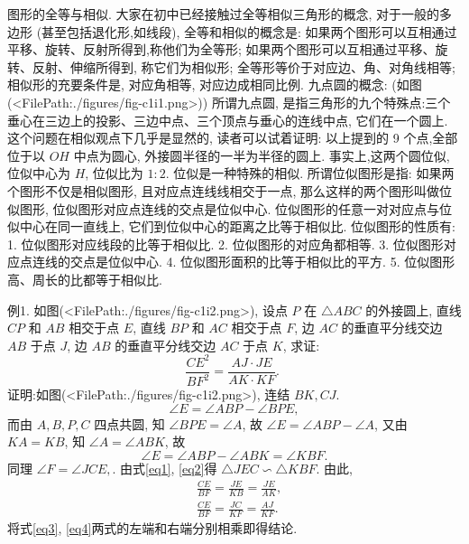 
图形的全等与相似.
大家在初中已经接触过全等相似三角形的概念, 对于一般的多边形 (甚至包括退化形,如线段), 全等和相似的概念是:
如果两个图形可以互相通过平移、旋转、反射所得到,称他们为全等形; 如果两个图形可以互相通过平移、旋转、反射、伸缩所得到, 称它们为相似形; 全等形等价于对应边、角、对角线相等; 相似形的充要条件是, 对应角相等, 对应边成相同比例.
九点圆的概念: (如图(<FilePath:./figures/fig-c1i1.png>))
所谓九点圆, 是指三角形的九个特殊点:三个垂心在三边上的投影、三边中点、三个顶点与垂心的连线中点, 它们在一个圆上.
这个问题在相似观点下几乎是显然的, 读者可以试着证明: 以上提到的 9 个点,全部位于以 $O H$ 中点为圆心, 外接圆半径的一半为半径的圆上.
事实上,这两个圆位似,位似中心为 $H$, 位似比为 $1: 2$.
位似是一种特殊的相似.
所谓位似图形是指: 如果两个图形不仅是相似图形, 且对应点连线线相交于一点, 那么这样的两个图形叫做位似图形, 位似图形对应点连线的交点是位似中心.
位似图形的任意一对对应点与位似中心在同一直线上, 它们到位似中心的距离之比等于相似比.
位似图形的性质有:
1. 位似图形对应线段的比等于相似比.
2. 位似图形的对应角都相等.
3. 位似图形对应点连线的交点是位似中心.
4. 位似图形面积的比等于相似比的平方.
5. 位似图形高、周长的比都等于相似比.



例1. 如图(<FilePath:./figures/fig-c1i2.png>), 设点 $P$ 在 $\triangle A B C$ 的外接圆上, 直线 $C P$ 和 $A B$ 相交于点 $E$, 直线 $B P$ 和 $A C$ 相交于点 $F$, 边 $A C$ 的垂直平分线交边 $A B$ 于点 $J$, 边 $A B$ 的垂直平分线交边 $A C$ 于点 $K$, 求证:
$$
\frac{C E^2}{B F^2}=\frac{A J \cdot J E}{A K \cdot K F} \text {. }
$$
证明:如图(<FilePath:./figures/fig-c1i2.png>), 连结 $B K, C J$.
$$
\angle E=\angle A B P-\angle B P E,
$$
而由 $A, B, P, C$ 四点共圆, 知 $\angle B P E=\angle A$, 故 $\angle E=\angle A B P-\angle A$, 又由 $K A=K B$, 知 $\angle A= \angle A B K$, 故
$$
\angle E=\angle A B P-\angle A B K=\angle K B F . \label{eq1}
$$
同理 $\angle F=\angle J C E, \label{eq2}$.
由式\ref{eq1}, \ref{eq2}得 $\triangle J E C \backsim \triangle K B F$.
由此,
$$
\begin{aligned}
& \frac{C E}{B F}=\frac{J E}{K B}=\frac{J E}{A K},  \label{eq3}\\
& \frac{C E}{B F}=\frac{J C}{K F}=\frac{A J}{K F} . \label{eq4}
\end{aligned}
$$
将式\ref{eq3}, \ref{eq4}两式的左端和右端分别相乘即得结论.



